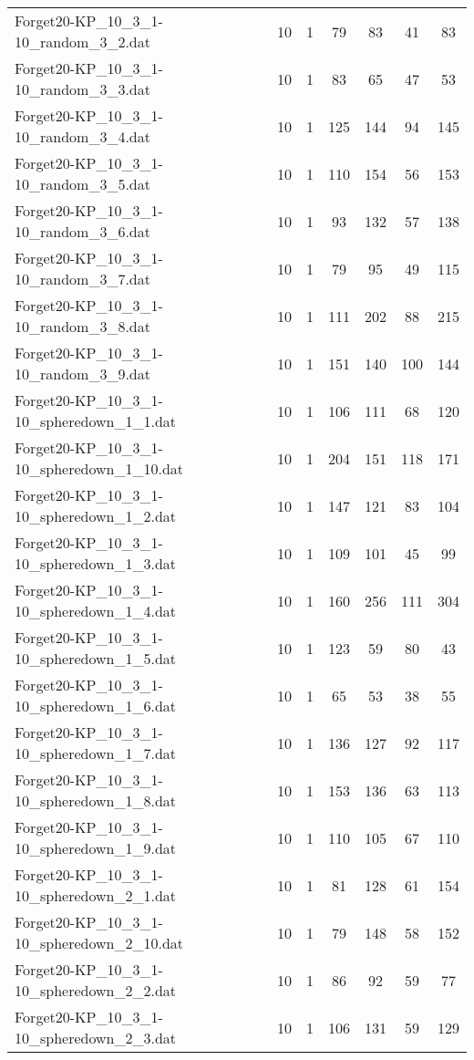 \begin{table}[!ht]
\begin{tabular}{lcccccc}
Forget20-KP\_10\_3\_1-10\_random\_3\_2.dat & 10 & 1 & 79 & 83 & 41 & 83 \\
Forget20-KP\_10\_3\_1-10\_random\_3\_3.dat & 10 & 1 & 83 & 65 & 47 & 53 \\
Forget20-KP\_10\_3\_1-10\_random\_3\_4.dat & 10 & 1 & 125 & 144 & 94 & 145 \\
Forget20-KP\_10\_3\_1-10\_random\_3\_5.dat & 10 & 1 & 110 & 154 & 56 & 153 \\
Forget20-KP\_10\_3\_1-10\_random\_3\_6.dat & 10 & 1 & 93 & 132 & 57 & 138 \\
Forget20-KP\_10\_3\_1-10\_random\_3\_7.dat & 10 & 1 & 79 & 95 & 49 & 115 \\
Forget20-KP\_10\_3\_1-10\_random\_3\_8.dat & 10 & 1 & 111 & 202 & 88 & 215 \\
Forget20-KP\_10\_3\_1-10\_random\_3\_9.dat & 10 & 1 & 151 & 140 & 100 & 144 \\
Forget20-KP\_10\_3\_1-10\_spheredown\_1\_1.dat & 10 & 1 & 106 & 111 & 68 & 120 \\
Forget20-KP\_10\_3\_1-10\_spheredown\_1\_10.dat & 10 & 1 & 204 & 151 & 118 & 171 \\
Forget20-KP\_10\_3\_1-10\_spheredown\_1\_2.dat & 10 & 1 & 147 & 121 & 83 & 104 \\
Forget20-KP\_10\_3\_1-10\_spheredown\_1\_3.dat & 10 & 1 & 109 & 101 & 45 & 99 \\
Forget20-KP\_10\_3\_1-10\_spheredown\_1\_4.dat & 10 & 1 & 160 & 256 & 111 & 304 \\
Forget20-KP\_10\_3\_1-10\_spheredown\_1\_5.dat & 10 & 1 & 123 & 59 & 80 & 43 \\
Forget20-KP\_10\_3\_1-10\_spheredown\_1\_6.dat & 10 & 1 & 65 & 53 & 38 & 55 \\
Forget20-KP\_10\_3\_1-10\_spheredown\_1\_7.dat & 10 & 1 & 136 & 127 & 92 & 117 \\
Forget20-KP\_10\_3\_1-10\_spheredown\_1\_8.dat & 10 & 1 & 153 & 136 & 63 & 113 \\
Forget20-KP\_10\_3\_1-10\_spheredown\_1\_9.dat & 10 & 1 & 110 & 105 & 67 & 110 \\
Forget20-KP\_10\_3\_1-10\_spheredown\_2\_1.dat & 10 & 1 & 81 & 128 & 61 & 154 \\
Forget20-KP\_10\_3\_1-10\_spheredown\_2\_10.dat & 10 & 1 & 79 & 148 & 58 & 152 \\
Forget20-KP\_10\_3\_1-10\_spheredown\_2\_2.dat & 10 & 1 & 86 & 92 & 59 & 77 \\
Forget20-KP\_10\_3\_1-10\_spheredown\_2\_3.dat & 10 & 1 & 106 & 131 & 59 & 129 \\

\end{tabular}
\end{table}
